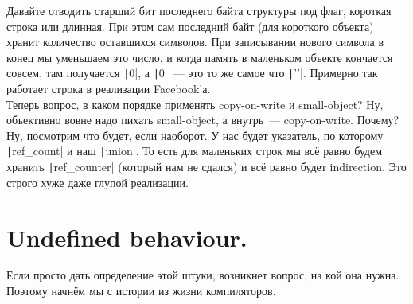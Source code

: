 \documentclass{article}
\begin{document}
    Давайте отводить старший бит последнего байта структуры под флаг, короткая строка или длинная. При этом сам последний байт (для короткого объекта) хранит количество оставшихся символов. При записывании нового символа в конец мы уменьшаем это число, и когда память в маленьком объекте кончается совсем, там получается \texttt|0|, а \texttt|0|~--- это то же самое что \texttt|'\0'|. Примерно так работает строка в реализации Facebook'а.\\
    Теперь вопрос, в каком порядке применять copy-on-write и small-object? Ну, объективно вовне надо пихать small-object, а внутрь~--- copy-on-write. Почему? Ну, посмотрим что будет, если наоборот. У нас будет указатель, по которому \texttt|ref_count| и наш \texttt|union|. То есть для маленьких строк мы всё равно будем хранить \texttt|ref_counter| (который нам не сдался) и всё равно будет indirection. Это строго хуже даже глупой реализации.
    \section{Undefined behaviour.}
    Если просто дать определение этой штуки, возникнет вопрос, на кой она нужна. Поэтому начнём мы с истории из жизни компиляторов.
\end{document}
